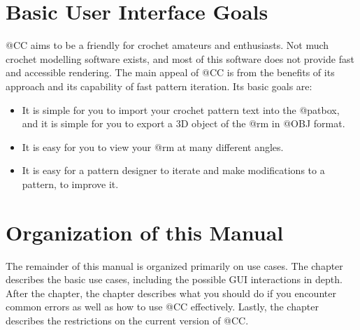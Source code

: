 \documentclass[main.tex]{subfiles}
\begin{document}
\section{Basic User Interface Goals}

@CC aims to be a friendly  for crochet amateurs and enthusiasts.
Not much crochet modelling software exists, and most of this software does not provide fast and accessible rendering.
The main appeal of @CC is from the benefits of its  approach and its capability of fast pattern iteration.
Its basic goals are:

\begin{itemize}
\item It is simple for you to import your crochet pattern text into the @patbox, and it is simple for you to export a 3D object of the @rm in @OBJ format.
\item It is easy for you to view your @rm at many different angles.
\item It is easy for a pattern designer to iterate and make modifications to a pattern, to improve it.
\end{itemize}

\section{Organization of this Manual}

The remainder of this manual is organized primarily on use cases.
The  chapter describes the basic use cases, including the possible GUI interactions in depth.
After the  chapter, the  chapter describes what you should do if you encounter common errors as well as how to use @CC effectively.
Lastly, the  chapter describes the restrictions on the current version of @CC.
\end{document}

